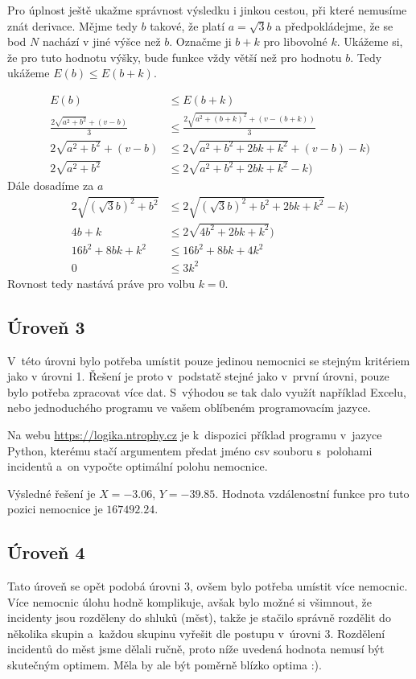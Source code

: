 \documentclass[12pt,a4paper]{article}
\begin{document}
Pro úplnost ještě ukažme správnost výsledku i jinkou cestou, při které nemusíme znát derivace. Mějme tedy $b$ takové, že platí $a = \sqrt{3}b$ a předpokládejme, že se bod $N$ nachází v jiné výšce než $b$.
Označme ji $b+k$ pro libovolné $k$. Ukážeme si, že pro tuto hodnotu výšky, bude funkce vždy větší než pro hodnotu $b$. Tedy ukážeme $E(b) \leq E(b+k)$.

\begin{align}
	E(b) &\leq E(b+k) \nonumber \\
	\frac{2 \sqrt{a^2+b^2} + (v - b)}{3} &\leq \frac{2 \sqrt{a^2+(b+k)^2} + (v - (b+k))}{3} \nonumber \\
	2 \sqrt{a^2+b^2} + (v - b) &\leq 2 \sqrt{a^2+b^2+2bk+k^2} + (v - b) - k) \nonumber \\
	2 \sqrt{a^2+b^2} &\leq 2 \sqrt{a^2+b^2+2bk+k^2} - k) \nonumber
\end{align}
	Dále dosadíme za $a$
\begin{align}
	2 \sqrt{(\sqrt{3}b)^2+b^2} &\leq 2 \sqrt{(\sqrt{3}b)^2+b^2+2bk+k^2} - k) \nonumber \\
	4b + k &\leq 2 \sqrt{4b^2+2bk+k^2}) \nonumber \\
	16b^2 + 8bk + k^2 &\leq 16b^2+8bk+4k^2 \nonumber \\
	0 &\leq 3k^2 \nonumber
\end{align}
Rovnost tedy nastává práve pro volbu $k=0$.


\subsection*{Úroveň 3}
V~této úrovni bylo potřeba umístit pouze jedinou nemocnici se stejným kritériem
jako v úrovni 1. Řešení je proto v~podstatě stejné jako v~první úrovni, pouze
bylo potřeba zpracovat více dat. S~výhodou se tak dalo využít například Excelu,
nebo jednoduchého programu ve vašem oblíbeném programovacím jazyce.

Na webu \url{https://logika.ntrophy.cz} je k~dispozici příklad programu
v~jazyce Python, kterému stačí argumentem předat jméno csv souboru s~polohami
incidentů a~on vypočte optimální polohu nemocnice.

Výsledné řešení je $X=-3.06$, $Y=-39.85$. Hodnota vzdálenostní funkce pro tuto
pozici nemocnice je $167492.24$.

\subsection*{Úroveň 4}
Tato úroveň se opět podobá úrovni 3, ovšem bylo potřeba umístit více nemocnic.
Více nemocnic úlohu hodně komplikuje, avšak bylo možné si všimnout, že
incidenty jsou rozděleny do shluků (měst), takže je stačilo správně rozdělit do
několika skupin a~každou skupinu vyřešit dle postupu v~úrovni 3. Rozdělení
incidentů do měst jsme dělali ručně, proto níže uvedená hodnota nemusí být
skutečným optimem. Měla by ale být poměrně blízko optima :).
\end{document}
